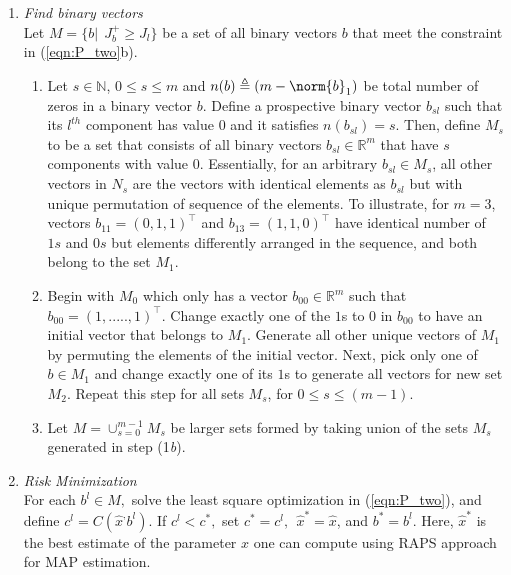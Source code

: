 \begin{enumerate}
	\item \textit{Find binary vectors} \\
	Let $M =  \{ b | \ \ J_{b}^+ \ge J_l \}$ be a set of all binary vectors $b$ that meet the constraint in (\ref{eqn:P_two}b). 
	\begin{enumerate}
		\item Let $s \in \mathbb{N}$, $0 \le s \le m$ and $n(b) \triangleq (m - \norm{b}_1)$ be total number of zeros in a binary vector $b$. Define a prospective binary vector $b_{sl}$ such that its $l^{th}$ component has value 0 and it satisfies $n(b_{sl}) = s$. 
		Then, define $M_s$ to be a set that consists of all binary vectors $b_{sl} \in \mathbb{R}^m$ that have $s$ components with value 0. 
		Essentially, for an arbitrary $b_{sl} \in M_s$, all other vectors in $N_s$ are the vectors with identical elements as $b_{sl}$ but with unique permutation of sequence of the elements. 
		To illustrate, for $m = 3$, vectors $b_{11} = (0,1,1)^\top$ and $b_{13} = (1,1,0)^\top$ have identical number of $1s$ and $0s$ but elements differently arranged in the sequence, and both belong to the set $M_1$.
		
		\item Begin with $M_0$ which only has a vector $b_{00} \in \mathbb{R}^m$ such that $b_{00} = (1,.....,1)^\top$. 
		Change exactly one of the $1$s to $0$ in $b_{00}$ to have an initial vector that belongs to $M_1$. Generate all other unique vectors of $M_1$ by permuting the elements of the initial vector. 
		Next, pick only one of $b \in M_1$ and change exactly one of its $1$s to generate all vectors for new set $M_2$. 
		Repeat this step for all sets $M_s$, for $0 \le s \le (m-1)$.
		
		\item Let $M = {\cup}^{m-1}_{s = 0} M_s$ be larger sets formed by taking union of the sets $M_s$ generated in step (1\textit{b}).
	\end{enumerate}

	\item \textit{Risk Minimization} \\
	For each $b^l \in M,$ solve the least square optimization in (\ref{eqn:P_two}), and define $c^l = C(\hat{x}^, b^l)$. If $c^l < c^*,$ set $c^* =  c^l, \ \ \hat{x}^* = \hat{x}$, and $b^* = b^l$. 
	Here, $\hat{x}^*$ is the best estimate of the parameter $x$ one can compute using RAPS approach for MAP estimation.

\end{enumerate}